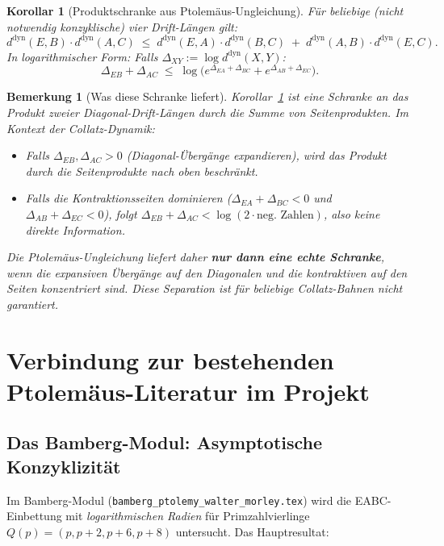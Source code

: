 \documentclass[12pt,a4paper]{article}
\newtheorem{korollar}[definition]{Korollar}
\newtheorem{bemerkung}[definition]{Bemerkung}
\begin{document}
\begin{korollar}[Produktschranke aus Ptolemäus-Ungleichung]
\label{kor:produktschranke}
Für beliebige (nicht notwendig konzyklische) vier Drift-Längen gilt:
\[
  d^{\mathrm{dyn}}(E,B) \cdot d^{\mathrm{dyn}}(A,C)
  \;\leq\;
  d^{\mathrm{dyn}}(E,A) \cdot d^{\mathrm{dyn}}(B,C)
  \;+\;
  d^{\mathrm{dyn}}(A,B) \cdot d^{\mathrm{dyn}}(E,C).
\]
In logarithmischer Form: Falls $\Delta_{XY} := \log d^{\mathrm{dyn}}(X,Y)$:
\[
  \Delta_{EB} + \Delta_{AC}
  \;\leq\;
  \log\!\bigl(
    e^{\Delta_{EA} + \Delta_{BC}} + e^{\Delta_{AB} + \Delta_{EC}}
  \bigr).
\]
\end{korollar}

\begin{bemerkung}[Was diese Schranke liefert]
Korollar~\ref{kor:produktschranke} ist eine Schranke an das \emph{Produkt}
zweier Diagonal-Drift-Längen durch die \emph{Summe} von Seitenprodukten.
Im Kontext der Collatz-Dynamik:
\begin{itemize}[leftmargin=*]
  \item Falls $\Delta_{EB}, \Delta_{AC} > 0$ (Diagonal-Übergänge expandieren),
    wird das Produkt durch die Seitenprodukte nach oben beschränkt.
  \item Falls die Kontraktionsseiten dominieren
    ($\Delta_{EA} + \Delta_{BC} < 0$ und $\Delta_{AB} + \Delta_{EC} < 0$),
    folgt $\Delta_{EB} + \Delta_{AC} < \log(2 \cdot \text{neg.\ Zahlen})$,
    also keine direkte Information.
\end{itemize}
Die Ptolemäus-Ungleichung liefert daher \textbf{nur dann eine echte Schranke},
wenn die expansiven Übergänge auf den Diagonalen und die kontraktiven auf
den Seiten konzentriert sind. Diese Separation ist für beliebige
Collatz-Bahnen nicht garantiert.
\end{bemerkung}

\section{Verbindung zur bestehenden Ptolemäus-Literatur im Projekt}
\label{sec:literatur}

\subsection{Das Bamberg-Modul: Asymptotische Konzyklizität}

Im Bamberg-Modul (\texttt{bamberg\_ptolemy\_walter\_morley.tex}) wird die
EABC-Einbettung mit \emph{logarithmischen Radien} für Primzahlvierlinge
$Q(p) = (p, p+2, p+6, p+8)$ untersucht. Das Hauptresultat:
\end{document}
